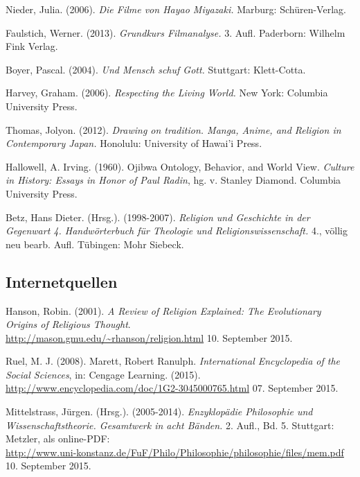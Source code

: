 \documentclass[a4paper]{article}
\begin{document}
\newpage
\begin{thebibliography}{9}

	Nieder, Julia. 
	(2006). 
	\emph{Die Filme von Hayao Miyazaki.}
	Marburg: Schüren-Verlag.

	Faulstich, Werner.
	(2013).
	\emph{Grundkurs Filmanalyse.} 
	3. Aufl. 
	Paderborn: Wilhelm Fink Verlag.

	Boyer, Pascal.
	(2004).
	\emph{Und Mensch schuf Gott.}
	Stuttgart: Klett-Cotta.

	Harvey, Graham.
	(2006).
	\emph{Respecting the Living World.}
	New York: Columbia University Press.

	Thomas, Jolyon.
	(2012).
	\emph{Drawing on tradition. Manga, Anime, and Religion in Contemporary Japan.}
	Honolulu: University of Hawai'i Press.

	Hallowell, A. Irving. (1960). \glqq Ojibwa Ontology, Behavior, and World View\glqq. \emph{Culture in History: Essays in Honor of Paul Radin}, hg. v. Stanley Diamond. Columbia University Press. 

	Betz, Hans Dieter. (Hrsg.). (1998-2007).
	\emph{Religion und Geschichte in der Gegenwart 4. Handwörterbuch für Theologie und Religionswissenschaft.} 4., völlig neu bearb. Aufl. Tübingen: Mohr Siebeck.

\subsection*{Internetquellen}

	Hanson, Robin. (2001). \emph{A Review of Religion Explained: The Evolutionary Origins of Religious Thought}. \\ \url{http://mason.gmu.edu/~rhanson/religion.html} 10. September 2015.

	Ruel, M. J. 
	(2008). 
	\glqq Marett, Robert Ranulph\grqq. \emph{International Encyclopedia of the Social Sciences}, in: Cengage Learning. (2015).\\ \url{http://www.encyclopedia.com/doc/1G2-3045000765.html} 07. September 2015.

	Mittelstrass, Jürgen. (Hrsg.). (2005-2014).
	\emph{Enzyklopädie Philosophie und Wissenschaftstheorie. Gesamtwerk in acht Bänden.} 2. Aufl., Bd. 5. Stuttgart: Metzler, als online-PDF:\\ \url{http://www.uni-konstanz.de/FuF/Philo/Philosophie/philosophie/files/mem.pdf} 10. September 2015.  


\end{thebibliography}
\end{document}

